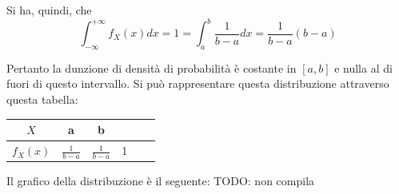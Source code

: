 Si ha, quindi, che
\[
  \int_{-\infty}^{+\infty} f_X(x) dx = 1 = \int_{a}^{b} \frac{1}{b-a} dx = \frac{1}{b-a} (b-a) 
\]


Pertanto la dunzione di densità di probabilità è costante in $[a,b]$ e nulla al di fuori di questo intervallo. Si può rappresentare questa distribuzione attraverso questa tabella:
\begin{center}
  \begin{tabular}{c|c|c|c|c|c}
    $X$ & a & b & \\
    \hline
    $f_X(x)$ & $\frac{1}{b-a}$ & $\frac{1}{b-a}$ & 1\\ 
  \end{tabular}
\end{center}
Il grafico della distribuzione è il seguente: TODO: non compila
%      
%      


